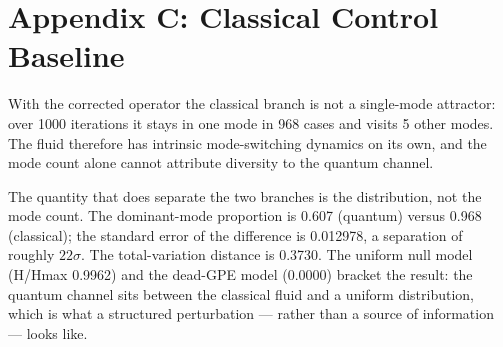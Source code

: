 \documentclass[sigconf,anonymous=false]{acmart}
\begin{document}
\section{Appendix C: Classical Control Baseline}

With the corrected operator the classical branch is not a single-mode attractor: over 1000 iterations it stays in one mode in 968 cases and visits 5 other modes. The fluid therefore has intrinsic mode-switching dynamics on its own, and the mode count alone cannot attribute diversity to the quantum channel.

The quantity that does separate the two branches is the distribution, not the mode count. The dominant-mode proportion is 0.607 (quantum) versus 0.968 (classical); the standard error of the difference is 0.012978, a separation of roughly $22\sigma$. The total-variation distance is 0.3730. The uniform null model (H/Hmax 0.9962) and the dead-GPE model (0.0000) bracket the result: the quantum channel sits between the classical fluid and a uniform distribution, which is what a structured perturbation --- rather than a source of information --- looks like.
\end{document}
